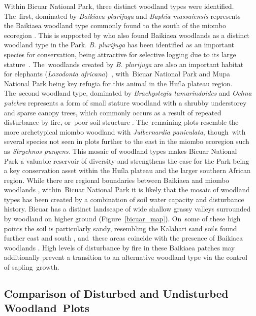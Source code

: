 \documentclass[diversity,article,accept,moreauthors,pdftex]{Definitions/mdpi}
\begin{document}
Within Bicuar National Park, three distinct woodland types were identified. The~first, dominated by \textit{Baikiaea plurijuga} and \textit{Baphia massaiensis} represents the Baikiaea woodland type commonly found to the south of the miombo ecoregion \citep{Timberlake2010}. This is supported by \citet{Chisingui2018} who also found Baikiaea woodlands as a distinct woodland type in the Park. \textit{B. plurijuga} has been identified as an important species for conservation, being attractive for selective logging due to its large \mbox{stature~\citep{Ngandwe2017, Wallenfang2015}}. The~woodlands created by \textit{B. plurijuga} are also an important habitat for elephants (\textit{Loxodonta africana})~\citep{Sianga2017, Mukwashi2012}, with~Bicuar National Park and Mupa National Park being key refugia for this animal in the Hu\'{i}la plateau region. The~second woodland type, dominated by \textit{Brachystegia tamarindoides} and \textit{Ochna pulchra} represents a form of small stature woodland with a shrubby understorey and sparse canopy trees, which commonly occurs as a result of repeated disturbance by fire, or~poor soil structure \citep{Smith2004}. The~remaining plots resemble the more archetypical miombo woodland with \textit{Julbernardia paniculata}, though~with several species not seen in plots further to the east in the miombo ecoregion such as \textit{Strychnos pungens}. This mosaic of woodland types makes Bicuar National Park a valuable reservoir of diversity and strengthens the case for the Park being a key conservation asset within the Hu\'{i}la plateau and the larger southern African region. While there are regional boundaries between Baikiaea and miombo woodlands \citep{White1983}, within~Bicuar National Park it is likely that the mosaic of woodland types has been created by a combination of soil water capacity and disturbance history. Bicuar has a distinct landscape of wide shallow grassy valleys surrounded by woodland on higher ground (Figure~\ref{bicuar_map}). On~some of these high points the soil is particularly sandy, resembling the Kalahari sand soils found further east and south \citep{Huntley2019}, and~these areas coincide with the presence of Baikiaea woodlands \citep{Campbell2002}. High levels of disturbance by fire in these Baikiaea patches may additionally prevent a transition to an alternative woodland type via the control of sapling~growth.

\subsection{Comparison of Disturbed and Undisturbed Woodland~Plots}
\end{document}
